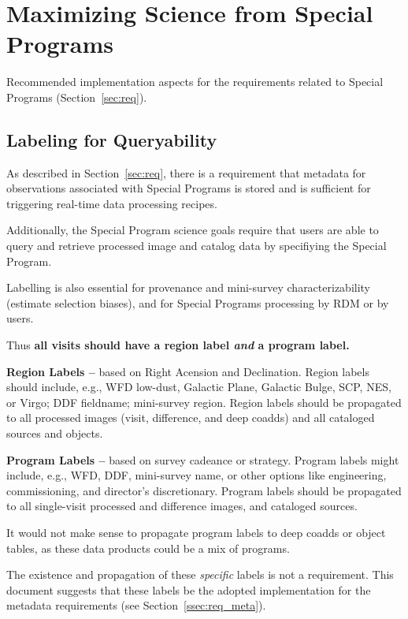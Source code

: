\section{Maximizing Science from Special Programs}\label{sec:sci}

Recommended implementation aspects for the requirements related to 
Special Programs (Section~\ref{sec:req}).


\subsection{Labeling for Queryability}\label{ssec:sci_labels}

As described in Section~\ref{sec:req}, there is a requirement that metadata for 
observations associated with Special Programs is stored and is sufficient for 
triggering real-time data processing recipes.

Additionally, the Special Program science goals require that users are able to 
query and retrieve processed image and catalog data by specifiying the Special Program. 

Labelling is also essential for provenance and mini-survey 
characterizability (estimate selection biases), and for Special Programs 
processing by RDM or by users.

Thus \textbf{all visits should have a region label \textit{and} a program 
label.}

\textbf{Region Labels -- } based on Right Acension and Declination.
Region labels should include, e.g., WFD low-dust, Galactic Plane, Galactic 
Bulge, SCP, NES, or Virgo; DDF fieldname; mini-survey region.
Region labels should be propagated to all processed images (visit, 
difference, and deep coadds) and all cataloged sources and objects. 

\textbf{Program Labels -- } based on survey cadeance or strategy.
Program labels might include, e.g., WFD, DDF, mini-survey name, or other 
options like engineering, commissioning, and director's discretionary.
Program labels should be propagated to all single-visit processed and 
difference images, and cataloged sources.

It would not make sense to propagate program labels to deep coadds or 
object tables, as these data products could be a mix of programs.

The existence and propagation of these \textit{specific} labels is not a 
requirement.
This document suggests that these labels be the adopted implementation for 
the metadata requirements (see Section~\ref{ssec:req_meta}).



